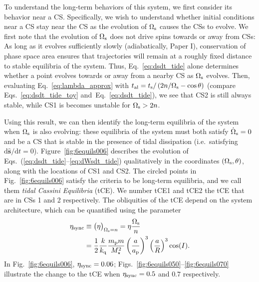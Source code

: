 \documentclass[
        fleqn,
        usenatbib,
    ]{mnras}
\newcommand*{\rdil}[2]{\mathrm{d}#1/\mathrm{d}#2}
\newcommand*{\p}[1]{\left(#1\right)}
\newcommand*{\uv}[1]{\hat{\boldsymbol{\mathbf{#1}}}}
\begin{document}
To understand the long-term behaviors of this system, we first consider its
behavior near a CS\@. Specifically, we wish to understand whether initial
conditions near a CS stay near the CS as the evolution of $\Omega_{\rm s}$
causes the CSs to evolve. We first note that the evolution of
$\Omega_{\rm s}$ does not drive spins towards or away from CSs: As long as it
evolves sufficiently slowly (adiabatically, Paper I), conservation of
phase space area ensures that trajectories will remain at a roughly fixed
distance to stable equilibria of the system. Thus, Eq.~\eqref{eq:dsdt_tide}
alone determines whether a point evolves towards or away from a nearby CS as
$\Omega_{\rm s}$ evolves. Then, evaluating Eq.~\eqref{eq:lambda_approx} with
$t_{\rm al} = t_{\rm s} / \p{2n / \Omega_{\rm s} - \cos \theta}$ (compare
Eqs.~\ref{eq:dsdt_tide_toy} and~Eq.~\ref{eq:dsdt_tide}), we see that CS2 is
still always stable, while CS1 is becomes unstable for $\Omega_{\rm s} > 2n$.

Using this result, we can then identify the long-term equilibria of the system
when $\Omega_{\rm s}$ is also evolving: these equilibria of the system must both
satisfy $\dot{\Omega}_{\rm s} = 0$ and be a CS that is stable in the presence of
tidal dissipation (i.e.\ satisfying $\rdil{\uv{s}}{t} = 0$).
Figure~\ref{fig:6equils006} describes the evolution of
Eqs.~(\ref{eq:dsdt_tide}--\ref{eq:dWsdt_tide}) qualitatively in the coordinates
$(\Omega_{\rm s}, \theta)$, along with the locations of CS1 and CS2. The circled
points in Fig.~\ref{fig:6equils006} satisfy the criteria to be long-term
equilibria, and we call them \emph{tidal Cassini Equilibria} (tCE). We number
tCE1 and tCE2 the tCE that are in CSs 1 and 2 respectively. The obliquities of
the tCE depend on the system architecture, which can be quantified using the
parameter
\begin{align}
    \eta_{\rm sync} &\equiv \big(\eta\big)_{\Omega_{\rm s} = n}
        = \eta \frac{\Omega_{\rm s}}{n}\nonumber\\
        &= \frac{1}{2}\frac{k}{k_{\rm q}}
            \frac{m_{\rm p}m}{M_\star^2}
            \p{\frac{a}{a_{\rm p}}}^3 \p{\frac{a}{R}}^3\cos(I).
            \label{eq:def_etasync}
\end{align}
In Fig.~\ref{fig:6equils006}, $\eta_{\rm sync} = 0.06$;
Figs.~\ref{fig:6equils050}--\ref{fig:6equils070} illustrate the change to the
tCE when $\eta_{\rm sync} = 0.5$ and $0.7$ respectively.
\end{document}
